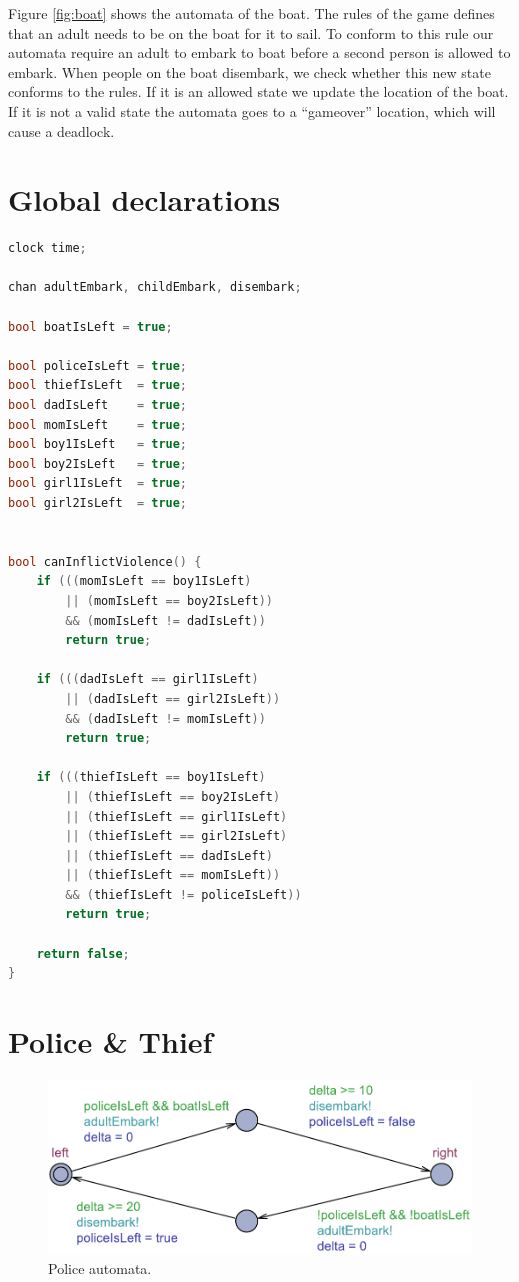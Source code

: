 \documentclass[a4paper,12pt]{scrartcl}
\begin{document}
Figure \ref{fig:boat} shows the automata of the boat. The rules of the game defines that an adult needs to be on the boat for it to sail. To conform to this rule our automata require an adult to embark to boat before a second person is allowed to embark. When people on the boat disembark, we check whether this new state conforms to the rules. If it is an allowed state we update the location of the boat. If it is not a valid state the automata goes to a ``gameover'' location, which will cause a deadlock.


\section*{Global declarations}

\begin{lstlisting}[language=CPP, label = lst:plugin_example, caption = Global declaration.]
clock time;

chan adultEmbark, childEmbark, disembark;

bool boatIsLeft = true;

bool policeIsLeft = true;
bool thiefIsLeft  = true;
bool dadIsLeft    = true;
bool momIsLeft    = true;
bool boy1IsLeft   = true;
bool boy2IsLeft   = true;
bool girl1IsLeft  = true;
bool girl2IsLeft  = true;


bool canInflictViolence() {
    if (((momIsLeft == boy1IsLeft)
    	|| (momIsLeft == boy2IsLeft))
    	&& (momIsLeft != dadIsLeft))
        return true;

    if (((dadIsLeft == girl1IsLeft)
    	|| (dadIsLeft == girl2IsLeft))
    	&& (dadIsLeft != momIsLeft))
        return true;

    if (((thiefIsLeft == boy1IsLeft)
    	|| (thiefIsLeft == boy2IsLeft)
    	|| (thiefIsLeft == girl1IsLeft)
    	|| (thiefIsLeft == girl2IsLeft)
    	|| (thiefIsLeft == dadIsLeft)
    	|| (thiefIsLeft == momIsLeft))
    	&& (thiefIsLeft != policeIsLeft))
        return true;

    return false;
}
\end{lstlisting}

\section*{Police \& Thief}

\begin{figure}[h!]
\centering
\includegraphics[width=0.7\linewidth]{Police.pdf}
\caption{Police automata.}
\label{fig:police}
\end{figure}
\end{document}
